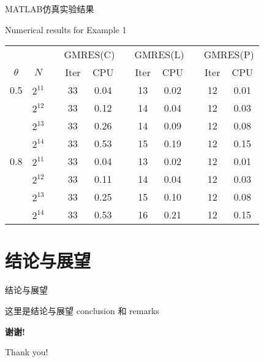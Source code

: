 \documentclass[10pt,compress,t,fontset=none]{ctexbeamer}
\begin{document}
\begin{frame}{MATLAB仿真实验结果}

\begin{center}
{Numerical results for Example 1}\smallskip

\begin{tabular}{ccccccccccc} \toprule
    &&&\multicolumn{2}{c}{GMRES(C)}
    &&\multicolumn{2}{c}{GMRES(L)}
    &&\multicolumn{2}{c}{GMRES(P)} \\ \cmidrule{4-5}\cmidrule{7-8}\cmidrule{10-11}
 $\theta$ & $N$ && Iter & CPU && Iter & CPU && Iter & CPU \\\hline
  0.5
 & $2^{11}$ &&  33&    0.04 &&  13&    0.02 &&  12&   0.01 \\
 & $2^{12}$ &&  33&    0.12 &&  14&    0.04 &&  12&   0.03 \\
 & $2^{13}$ &&  33&    0.26 &&  14&    0.09 &&  12&   0.08 \\
 & $2^{14}$ &&  33&    0.53 &&  15&    0.19 &&  12&   0.15 \\ \midrule
  0.8
 & $2^{11}$ &&  33&    0.04 &&  13&    0.02 &&  12&   0.01 \\
 & $2^{12}$ &&  33&    0.11 &&  14&    0.04 &&  12&   0.03 \\
 & $2^{13}$ &&  33&    0.25 &&  15&    0.10 &&  12&   0.08 \\
 & $2^{14}$ &&  33&    0.53 &&  16&    0.21 &&  12&   0.15 \\ \bottomrule
\end{tabular}
\end{center}

\end{frame}

\section{结论与展望}
\begin{frame}{结论与展望}

   这里是结论与展望 conclusion 和 remarks

\end{frame}


\begin{frame}[c,plain]
\begin{center}
\Huge\color{red}\bfseries 谢\quad 谢!

  Thank you!
\end{center}
\end{frame}
\end{document}
